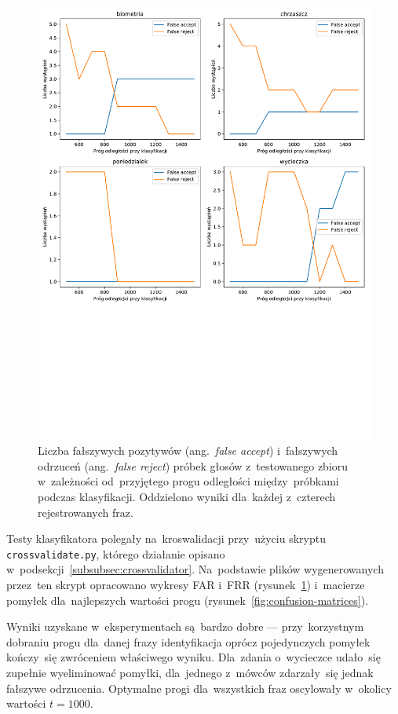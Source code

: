 \documentclass[11pt,a4paper]{article}
\begin{document}
\begin{figure}
    \centering
    \includegraphics[width=\textwidth]{res/plots/acceptance_rates.pdf}
    \caption{Liczba fałszywych pozytywów (ang.~\emph{false accept}) i~fałszywych odrzuceń (ang.~\emph{false reject}) próbek głosów z~testowanego zbioru w~zależności od~przyjętego progu odległości między~próbkami podczas klasyfikacji.
    Oddzielono wyniki dla~każdej z~czterech rejestrowanych fraz.}
    \label{fig:acceptance-rates}
\end{figure}
Testy klasyfikatora polegały na~kroswalidacji przy~użyciu skryptu \texttt{crossvalidate.py}, którego działanie opisano w~podsekcji~\ref{subsubsec:crossvalidator}.
Na~podstawie plików wygenerowanych przez~ten skrypt opracowano wykresy FAR i~FRR (rysunek~\ref{fig:acceptance-rates}) i~macierze pomyłek dla~najlepszych wartości progu (rysunek~\ref{fig:confusion-matrices}).

Wyniki uzyskane w~eksperymentach są~bardzo dobre --- przy~korzystnym dobraniu progu dla~danej frazy identyfikacja oprócz pojedynczych pomyłek kończy~się zwróceniem właściwego wyniku.
Dla~zdania o~wycieczce udało~się zupełnie wyeliminować pomyłki, dla~jednego z~mówców zdarzały~się jednak fałszywe odrzucenia.
Optymalne progi dla~wszystkich fraz oscylowały w~okolicy wartości $t = 1000$.
\end{document}
